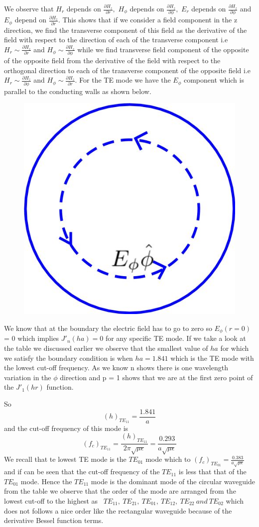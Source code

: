 We observe that $H_r$ depends on $\frac{\partial H_z}{\partial r},$ $H_\phi$ depends on $\frac{\partial H_z}{\partial \phi},$  $E_r$ depends on $\frac{\partial H_z}{\partial \phi}$ and $E_\phi$ depend on $\frac{\partial H_z}{\partial r}$. This shows that if we consider a field component in the z direction, we find the transverse component of this field as the derivative of the field with respect to the direction of each of the transverse component i.e $H_r \sim \frac{\partial H_z}{\partial r}$ and $H_\phi \sim \frac{\partial H_z}{\partial \phi}$  while we find transverse field component of the opposite of the opposite field from the derivative of the field with respect to the orthogonal direction to each of the transverse 	component of the opposite field i.e $H_r \sim \frac{\partial H_z}{\partial \phi}$ and $H_\phi \sim \frac{\partial H_z}{\partial r}$.     
For the TE mode we have the $E_\phi$ component  which is parallel to the conducting walls as shown below.
\begin{figure}[h]
\centering
\includegraphics[width=0.5\linewidth]{./graphics/m5}
\label{fig:m5}
\end{figure}

We know that at the boundary the electric field has to go to zero so $E_\phi(r = 0)$ = 0 which implies $J'_n(ha) = 0$ for any specific TE mode. If we take a look at the table we discussed earlier we observe that the smallest value  of $ha$ for which we satisfy the boundary condition is when $ha= 1.841$ which is the TE mode with the lowest cut-off frequency. As we know n shows there is one wavelength variation in the $\phi$ direction and p = 1 shows that we are at  the first zero point of the $J'_1(hr)$ function.

So
$$(h)_{TE_{11}} = \frac{1.841}{a}$$
and the cut-off frequency of this mode is 
$$(f_c)_{TE_{11}} = \frac{(h)_{TE_{11}}}{2\pi\sqrt{\mu\epsilon}} = \frac{0.293}{a\sqrt{\mu\epsilon}}$$	
We recall that te lowest TE mode is the $TE_{01}$ mode which  to $(f_c)_{TE_{01}} = \frac{0.383}{a\sqrt{\mu\epsilon}}$ and if can be seen that the cut-off frequency of the $TE_{11}$ is less that that of the $TE_{01}$ mode. Hence the $TE_{11}$ mode is the dominant mode of the circular waveguide from the table we observe that the order of the mode are arranged from the lowest cut-off to the highest as \  $TE_{11}, \  TE_{21}, \ TE_{01}, \ TE_{12}, \ TE_{22} \ and \ TE_{02}$ which does not follows a nice order like the rectangular waveguide because of the derivative Bessel function terms.


